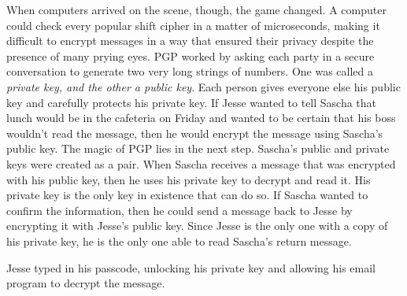 \documentclass[12pt]{book}
\begin{document}
When computers arrived on the scene, though, the game changed.  A computer could check every popular shift cipher in a matter of microseconds, making it difficult to encrypt messages in a way that ensured their privacy despite the presence of many prying eyes.  PGP worked by asking each party in a secure conversation to generate two very long strings of numbers.  One was called a \emph{private key\emph{, and the other a }public key}.  Each person gives everyone else his public key and carefully protects his private key.  If Jesse wanted to tell Sascha that lunch would be in the cafeteria on Friday and wanted to be certain that his boss wouldn't read the message, then he would encrypt the message using Sascha's public key.  The magic of PGP lies in the next step.  Sascha's public and private keys were created as a pair.  When Sascha receives a message that was encrypted with his public key, then he uses his private key to decrypt and read it.  His private key is the only key in existence that can do so.  If Sascha wanted to confirm the information, then he could send a message back to Jesse by encrypting it with Jesse's public key.  Since Jesse is the only one with a copy of his private key, he is the only one able to read Sascha's return message.


Jesse typed in his passcode, unlocking his private key and allowing his email program to decrypt the message.
\end{document}
